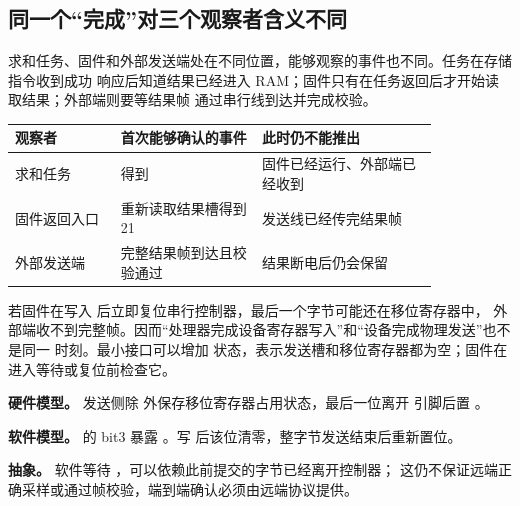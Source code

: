 \subsection{同一个“完成”对三个观察者含义不同}

求和任务、固件和外部发送端处在不同位置，能够观察的事件也不同。任务在存储指令收到成功
响应后知道结果已经进入 RAM；固件只有在任务返回后才开始读取结果；外部端则要等结果帧
通过串行线到达并完成校验。

\begin{longtable}{|L{0.21\linewidth}|L{0.28\linewidth}|L{0.35\linewidth}|}
\hline
{}
观察者 & 首次能够确认的事件 & 此时仍不能推出 \\ \hline
求和任务 &  得到  & 固件已经运行、外部端已经收到 \\ \hline
固件返回入口 & 重新读取结果槽得到 21 & 发送线已经传完结果帧 \\ \hline
外部发送端 & 完整结果帧到达且校验通过 & 结果断电后仍会保留 \\ \hline
\end{longtable}

若固件在写入  后立即复位串行控制器，最后一个字节可能还在移位寄存器中，
外部端收不到完整帧。因而“处理器完成设备寄存器写入”和“设备完成物理发送”也不是同一
时刻。最小接口可以增加  状态，表示发送槽和移位寄存器都为空；固件在
进入等待或复位前检查它。

\textbf{硬件模型。} 发送侧除  外保存移位寄存器占用状态，最后一位离开
引脚后置 。

\textbf{软件模型。}  的 bit3 暴露 。写
 后该位清零，整字节发送结束后重新置位。

\textbf{抽象。} 软件等待 ，可以依赖此前提交的字节已经离开控制器；
这仍不保证远端正确采样或通过帧校验，端到端确认必须由远端协议提供。

\begin{center}
\end{center}


